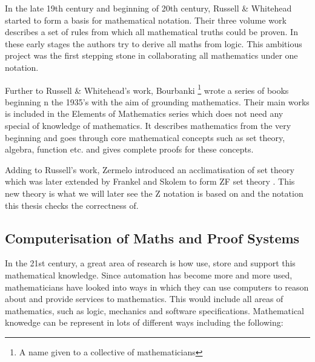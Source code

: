 In the late 19th century and beginning of 20th century, Russell \& Whitehead \cite{whitehead1912principia} started to form a basis for mathematical notation. Their three volume work describes a set of rules from which all mathematical truths could be proven. In these early stages the authors try to derive all maths from logic. This ambitious project was the first stepping stone in collaborating all mathematics under one notation.

Further to Russell \& Whitehead's work, Bourbanki \footnote{A name given to a collective of mathematicians} wrote a series of books beginning n the 1935's with the aim of grounding mathematics. Their main works is included in the Elements of Mathematics series \cite{opac-b1128208} which does not need any special of knowledge of mathematics. It describes mathematics from the very beginning and goes through core mathematical concepts such as set theory, algebra, function etc. and gives complete proofs for these concepts.

Adding to Russell's work, Zermelo introduced an acclimatisation of set theory which was later extended by Frankel and Skolem to form ZF set theory \cite{zfc}. This new theory is what we will later see the Z notation is based on and the notation this thesis checks the correctness of.

\subsection{Computerisation of Maths and Proof Systems}

In the 21st century, a great area of research is how use, store and support this mathematical knowledge. Since automation has become more and more used, mathematicians have looked into ways in which they can use computers to reason about and provide services to mathematics. This would include all areas of mathematics, such as logic, mechanics and software specifications. Mathematical knowedge can be represent in lots of different ways including the following:

